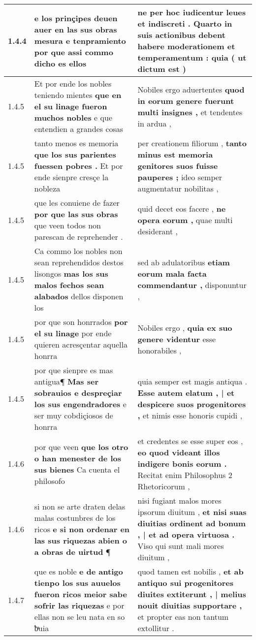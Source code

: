 \begin{tabular}{|p{1cm}|p{6.5cm}|p{6.5cm}|}
1.4.4 & e los prinçipes deuen auer \textbf{ en las sus obras mesura e tenpramiento } por que assi commo dicho es ellos & ne per hoc iudicentur leues et indiscreti . \textbf{ Quarto in suis actionibus debent habere moderationem et temperamentum : } quia ( ut dictum est ) \\\hline
1.4.5 & Et por ende los nobles teniendo mientes \textbf{ que en el su linage fueron muchos nobles } e que entendien a grandes cosas & Nobiles ergo aduertentes \textbf{ quod in eorum genere fuerunt multi insignes , } et tendentes in ardua , \\\hline
1.4.5 & tanto menos es memoria \textbf{ que los sus parientes fuessen pobres . } Et por ende sienpre cresçe la nobleza & per creationem filiorum , \textbf{ tanto minus est memoria genitores suos fuisse pauperes ; } ideo semper augmentatur nobilitas , \\\hline
1.4.5 & que les conuiene de fazer \textbf{ por que las sus obras } que veen todos non parescan de reprehender . & quid decet eos facere , \textbf{ ne opera eorum , } quae multi desiderant , \\\hline
1.4.5 & Ca commo los nobles non sean reprehendidos destos lisongos \textbf{ mas los sus malos fechos sean alabados } dellos disponen los & sed ab adulatoribus \textbf{ etiam eorum mala facta commendantur , } disponuntur , \\\hline
1.4.5 & por que son honrrados \textbf{ por el su linage } por ende quieren acresçentar aquella honrra & Nobiles ergo , \textbf{ quia ex suo genere videntur } esse honorabiles , \\\hline
1.4.5 & por que sienpre es mas antigua¶ \textbf{ Mas ser sobrauios e despreçiar los sus engendradores } e ser muy cobdiçiosos de honrra & quia semper est magis antiqua . \textbf{ Esse autem elatum , | et despicere suos progenitores , } et nimis esse honoris cupidi , \\\hline
1.4.6 & por que veen \textbf{ que los otro o han menester de los sus bienes } Ca cuenta el philosofo & et credentes se esse super eos , \textbf{ eo quod videant illos indigere bonis eorum . } Recitat enim Philosophus 2 Rhetoricorum , \\\hline
1.4.6 & si non se arte draten delas malas costunbres de los ricos \textbf{ e si non ordenar en las sus riquezas abien o a obras de uirtud } ¶ & nisi fugiant malos mores ipsorum diuitum , \textbf{ et nisi suas diuitias ordinent ad bonum , | et ad opera virtuosa . } Viso qui sunt mali mores diuitum , \\\hline
1.4.7 & que es noble \textbf{ e de antigo tienpo los sus auuelos fueron ricos meior sabe sofrir las riquezas } e por ellas non se leu nata en so ƀͣuia & quod tamen est nobilis , \textbf{ et ab antiquo sui progenitores diuites extiterunt , | melius nouit diuitias supportare , } et propter eas non tantum extollitur . \\\hline

\end{tabular}
